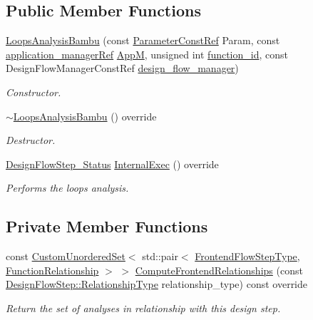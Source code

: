 \subsection*{Public Member Functions}
\begin{DoxyCompactItemize}
\item 
\hyperlink{classLoopsAnalysisBambu_a25111d0a00359cce1834b5a2362fc9fc}{Loops\+Analysis\+Bambu} (const \hyperlink{Parameter_8hpp_a37841774a6fcb479b597fdf8955eb4ea}{Parameter\+Const\+Ref} Param, const \hyperlink{application__manager_8hpp_a04ccad4e5ee401e8934306672082c180}{application\+\_\+manager\+Ref} \hyperlink{classFrontendFlowStep_a0ac0d8db2a378416583f51c4faa59d15}{AppM}, unsigned int \hyperlink{classFunctionFrontendFlowStep_a58ef2383ad1a212a8d3f396625a4b616}{function\+\_\+id}, const Design\+Flow\+Manager\+Const\+Ref \hyperlink{classDesignFlowStep_ab770677ddf087613add30024e16a5554}{design\+\_\+flow\+\_\+manager})
\begin{DoxyCompactList}\small\item\em Constructor. \end{DoxyCompactList}\item 
\hyperlink{classLoopsAnalysisBambu_a4d5bca07caaee5b94dfdbb93945b5c02}{$\sim$\+Loops\+Analysis\+Bambu} () override
\begin{DoxyCompactList}\small\item\em Destructor. \end{DoxyCompactList}\item 
\hyperlink{design__flow__step_8hpp_afb1f0d73069c26076b8d31dbc8ebecdf}{Design\+Flow\+Step\+\_\+\+Status} \hyperlink{classLoopsAnalysisBambu_a74777cea2f8fe8405e32a348d585a3d1}{Internal\+Exec} () override
\begin{DoxyCompactList}\small\item\em Performs the loops analysis. \end{DoxyCompactList}\end{DoxyCompactItemize}
\subsection*{Private Member Functions}
\begin{DoxyCompactItemize}
\item 
const \hyperlink{classCustomUnorderedSet}{Custom\+Unordered\+Set}$<$ std\+::pair$<$ \hyperlink{frontend__flow__step_8hpp_afeb3716c693d2b2e4ed3e6d04c3b63bb}{Frontend\+Flow\+Step\+Type}, \hyperlink{classFrontendFlowStep_af7cf30f2023e5b99e637dc2058289ab0}{Function\+Relationship} $>$ $>$ \hyperlink{classLoopsAnalysisBambu_aaec0d9291ce9081fe0e7b3c71bd76928}{Compute\+Frontend\+Relationships} (const \hyperlink{classDesignFlowStep_a723a3baf19ff2ceb77bc13e099d0b1b7}{Design\+Flow\+Step\+::\+Relationship\+Type} relationship\+\_\+type) const override
\begin{DoxyCompactList}\small\item\em Return the set of analyses in relationship with this design step. \end{DoxyCompactList}\end{DoxyCompactItemize}
